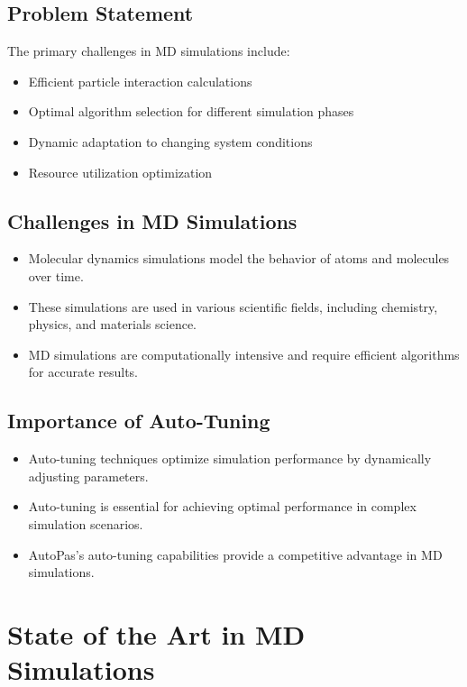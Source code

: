 \documentclass[conference]{IEEEtran}
\begin{document}
\subsection{Problem Statement}
The primary challenges in MD simulations include:
\begin{itemize}
    \item Efficient particle interaction calculations
    \item Optimal algorithm selection for different simulation phases
    \item Dynamic adaptation to changing system conditions
    \item Resource utilization optimization
\end{itemize}

\subsection{Challenges in MD Simulations}

\begin{itemize}
    \item Molecular dynamics simulations model the behavior of atoms and molecules over time.
    \item These simulations are used in various scientific fields, including chemistry, physics, and materials science.
    \item MD simulations are computationally intensive and require efficient algorithms for accurate results.
\end{itemize}

\subsection{Importance of Auto-Tuning}
\begin{itemize}
    \item Auto-tuning techniques optimize simulation performance by dynamically adjusting parameters.
    \item Auto-tuning is essential for achieving optimal performance in complex simulation scenarios.
    \item AutoPas's auto-tuning capabilities provide a competitive advantage in MD simulations.
\end{itemize}

\section{State of the Art in MD Simulations}
\end{document}
